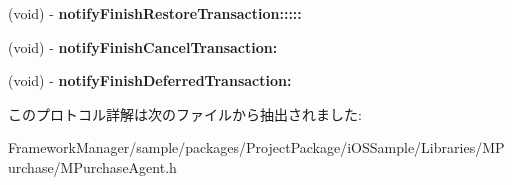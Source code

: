 \begin{DoxyCompactItemize}
\item 
\hypertarget{protocol_m_purchase_delegate-p_a0ed12c2745810c7405787f6e4aa3702b}{}(void) -\/ {\bfseries notify\+Finish\+Restore\+Transaction\+:::::}\label{protocol_m_purchase_delegate-p_a0ed12c2745810c7405787f6e4aa3702b}

\item 
\hypertarget{protocol_m_purchase_delegate-p_a863e8e3f884470c1b977d58f5d34abbb}{}(void) -\/ {\bfseries notify\+Finish\+Cancel\+Transaction\+:}\label{protocol_m_purchase_delegate-p_a863e8e3f884470c1b977d58f5d34abbb}

\item 
\hypertarget{protocol_m_purchase_delegate-p_ab270a010df8affd9b8937cb3f4826365}{}(void) -\/ {\bfseries notify\+Finish\+Deferred\+Transaction\+:}\label{protocol_m_purchase_delegate-p_ab270a010df8affd9b8937cb3f4826365}

\end{DoxyCompactItemize}


このプロトコル詳解は次のファイルから抽出されました\+:\begin{DoxyCompactItemize}
\item 
Framework\+Manager/sample/packages/\+Project\+Package/i\+O\+S\+Sample/\+Libraries/\+M\+Purchase/M\+Purchase\+Agent.\+h\end{DoxyCompactItemize}
